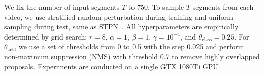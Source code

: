 \documentclass[letterpaper]{article} %
\begin{document}
We fix the number of input segments $T$ to 750. To sample $T$ segments from each video, we use stratified random perturbation during training and uniform sampling during test, same as STPN~\cite{nguyen2018weakly}. All hyperparameters are empirically determined by grid search; $r=8$, $\alpha=1$, $\beta=1$, $\gamma=10^{-4}$, and $\theta _{\text{class}}=0.25$. For $\theta _{\text{act}}$, we use a set of thresholds from 0 to 0.5 with the step 0.025 and perform non-maximum suppression (NMS) with threshold 0.7 to remove highly overlapped proposals. Experiments are conducted on a single GTX 1080Ti GPU.

\begin{table}[t]
\caption{
Effect of each component on the action localization performance on THUMOS'14. The column AVG denotes the average mAP under the IoU thresholds from 0.1 to 0.9
}
\begin{center}
\end{center}
\end{table}
\end{document}
